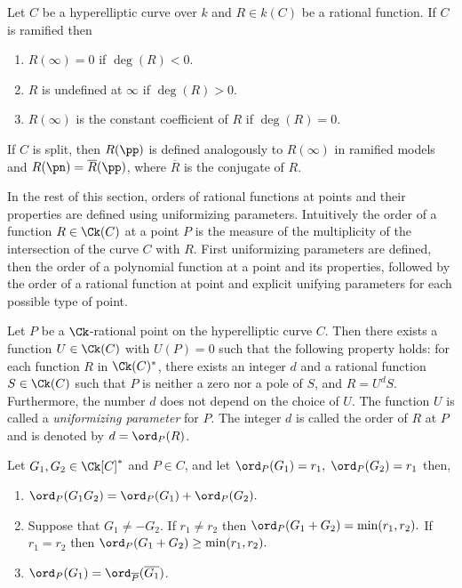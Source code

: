 \bd\label{def:infratval}
\cite[Adapted from Definition~17]{MenezesWuZuccherato_elementary_1996} Let $C$
be a hyperelliptic curve over $k$ and $R \in k(C)$ be a rational function. If
$C$ is ramified then \begin{enumerate}
    \item $R(\infty) = 0 $ if $\deg(R) < 0$.
    \item $R$ is undefined at $\infty$ if $\deg(R) > 0$.
    \item $R(\infty)$ is the constant coefficient of $R$ if $\deg(R) = 0$.
\end{enumerate} If $C$ is split, then $R(\pp)$ is defined analogously to
$R(\infty)$ in ramified models and $R(\pn) = \overline{R}(\pp)$, where
$\overline{R}$ is the conjugate of $R$.
\ed

In the rest of this section, orders of rational functions at points and their properties
are defined using uniformizing parameters. Intuitively the order of a function
$R \in \Ck(C)$ at a point $P$ is the measure of the multiplicity of the
intersection of the curve $C$ with $R$.  First uniformizing parameters are
defined, then the order of a polynomial function at a point and its properties,
followed by the order of a rational function at point and explicit unifying
parameters for each possible type of point.

\bd\label{def:uniformizing}
\cite[Adapted from Definitions~23 and~24]{MenezesWuZuccherato_elementary_1996} Let $P$
be a $\Ck$-rational point on the hyperelliptic curve $C$. Then there exists a
function $U \in \Ck(C)$ with $U(P) = 0$ such that the following property holds:
for each function $R$ in $\Ck(C)^*$, there exists an integer $d$ and a
rational function $S \in \Ck(C)$ such that $P$ is neither a zero nor a pole of
$S$, and $R  = U^dS$. Furthermore, the number $d$ does not depend on the choice
of $U$. The function $U$ is called a \emph{uniformizing parameter} for $P$. The
integer $d$ is called the order of $R$ at $P$ and is denoted by $d =
\ord_P(R)$.
\ed


\bl \label{lem:orderproperties} \cite[Adapted from Lemmas~25
and~28]{MenezesWuZuccherato_elementary_1996}  Let $G_1,G_2 \in \Ck[C]^{\ast}$
and $P \in C$, and let $\ord_P(G_1) = r_1,$ $\ord_P(G_2) = r_1$ then, 
\begin{enumerate}
\item $\ord_P(G_1G_2) = \ord_P(G_1) + \ord_P(G_2).$
\item Suppose that $G_1 \neq -G_2.$ If $r_1 \neq r_2$ then $\ord_P(G_1 + G_2) =
\min(r_1,r_2).$ If $r_1 = r_2$ then $\ord_P(G_1 + G_2) \geq \min(r_1,r_2).$
\item $\ord_P(G_1) = \ord_{\overline{P}}(\overline{G_1})$.
\end{enumerate}
\el

